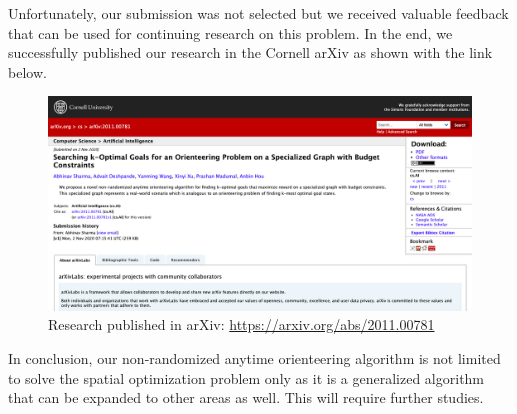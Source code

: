Unfortunately, our submission was not selected but we received valuable feedback that can be used for continuing research on this problem. In the end, we successfully published our research in the Cornell arXiv as shown with the link below.

\begin{figure}[H]
\centering
\includegraphics[width=15cm]{resources/images/achieve2.png}
\caption{Research published in arXiv: \url{https://arxiv.org/abs/2011.00781}}
\label{fig:achieve2}
\end{figure}

In conclusion, our non-randomized anytime orienteering algorithm is not limited to solve the spatial optimization problem only as it is a generalized algorithm that can be expanded to other areas as well. This will require further studies.